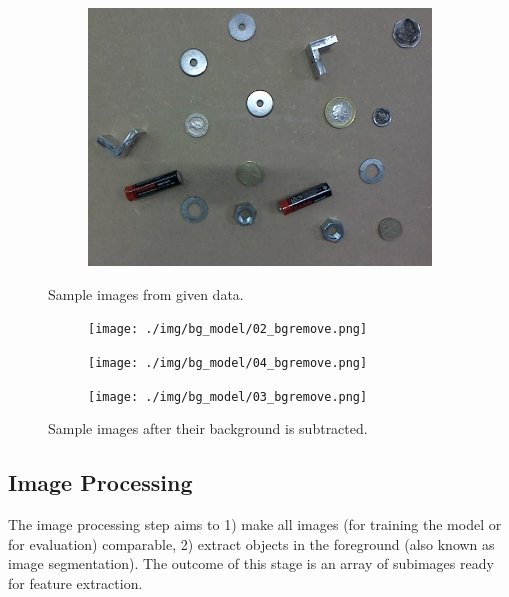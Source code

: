 \documentclass[main.tex]{subfiles}
\begin{document}
\begin{figure}[!h]
\begin{subfigure}[b]{.3\textwidth}
    \includegraphics[width=\textwidth]{./img/sample_fig/03.jpg}
  \end{subfigure}
  \caption{Sample images from given data.}
  \label{montage_data}
\end{figure}
\begin{figure}[!h]
  \centering
  \begin{subfigure}[b]{.3\textwidth}
    \centering
    \texttt{[image: ./img/bg\_model/02\_bgremove.png]}
  \end{subfigure}
  \begin{subfigure}[b]{.3\textwidth}
    \centering
    \texttt{[image: ./img/bg\_model/04\_bgremove.png]}
  \end{subfigure}
  \begin{subfigure}[b]{.3\textwidth}
    \centering
    \texttt{[image: ./img/bg\_model/03\_bgremove.png]}
  \end{subfigure}
  \caption{Sample images after their background is subtracted.}
  \label{montage_data_bgremove}
\end{figure}





\subsection{Image Processing}
The image processing step aims to 1) make all images (for training the model or for evaluation) comparable, 2) extract objects in the foreground (also known as image segmentation). The outcome of this stage is an array of subimages ready for feature extraction.
\end{document}
